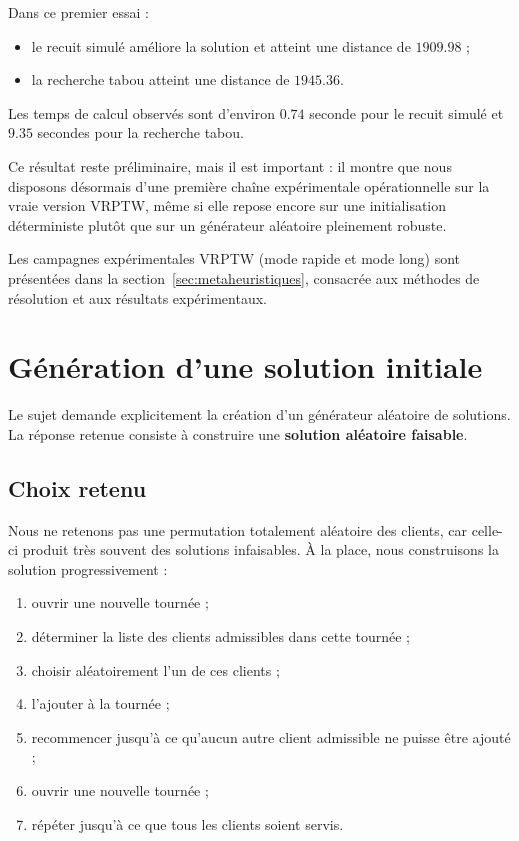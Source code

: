 \documentclass[11pt,a4paper]{article}
\begin{document}
Dans ce premier essai :
\begin{itemize}
    \item le recuit simulé améliore la solution et atteint une distance de \(1909.98\) ;
    \item la recherche tabou atteint une distance de \(1945.36\).
\end{itemize}

Les temps de calcul observés sont d'environ \(0.74\) seconde pour le recuit simulé et \(9.35\) secondes pour la recherche tabou.

Ce résultat reste préliminaire, mais il est important : il montre que nous disposons désormais d'une première chaîne expérimentale opérationnelle sur la vraie version VRPTW, même si elle repose encore sur une initialisation déterministe plutôt que sur un générateur aléatoire pleinement robuste.

Les campagnes expérimentales VRPTW (mode rapide et mode long) sont présentées dans la section~\ref{sec:metaheuristiques}, consacrée aux méthodes de résolution et aux résultats expérimentaux.

\section{Génération d'une solution initiale}

Le sujet demande explicitement la création d'un générateur aléatoire de solutions. La réponse retenue consiste à construire une \textbf{solution aléatoire faisable}.

\subsection{Choix retenu}
Nous ne retenons pas une permutation totalement aléatoire des clients, car celle-ci produit très souvent des solutions infaisables. À la place, nous construisons la solution progressivement :

\begin{enumerate}[label=\arabic*.]
    \item ouvrir une nouvelle tournée ;
    \item déterminer la liste des clients admissibles dans cette tournée ;
    \item choisir aléatoirement l'un de ces clients ;
    \item l'ajouter à la tournée ;
    \item recommencer jusqu'à ce qu'aucun autre client admissible ne puisse être ajouté ;
    \item ouvrir une nouvelle tournée ;
    \item répéter jusqu'à ce que tous les clients soient servis.
\end{enumerate}
\end{document}
